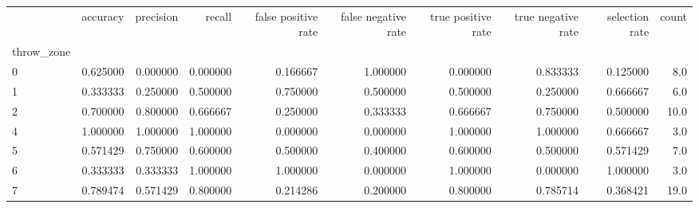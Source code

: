 \begin{tabular}{lrrrrrrrrr}
\toprule
{} &  accuracy &  precision &    recall &  false positive rate &  false negative rate &  true positive rate &  true negative rate &  selection rate &  count \\
throw\_zone &           &            &           &                      &                      &                     &                     &                 &        \\
\midrule
0          &  0.625000 &   0.000000 &  0.000000 &             0.166667 &             1.000000 &            0.000000 &            0.833333 &        0.125000 &    8.0 \\
1          &  0.333333 &   0.250000 &  0.500000 &             0.750000 &             0.500000 &            0.500000 &            0.250000 &        0.666667 &    6.0 \\
2          &  0.700000 &   0.800000 &  0.666667 &             0.250000 &             0.333333 &            0.666667 &            0.750000 &        0.500000 &   10.0 \\
4          &  1.000000 &   1.000000 &  1.000000 &             0.000000 &             0.000000 &            1.000000 &            1.000000 &        0.666667 &    3.0 \\
5          &  0.571429 &   0.750000 &  0.600000 &             0.500000 &             0.400000 &            0.600000 &            0.500000 &        0.571429 &    7.0 \\
6          &  0.333333 &   0.333333 &  1.000000 &             1.000000 &             0.000000 &            1.000000 &            0.000000 &        1.000000 &    3.0 \\
7          &  0.789474 &   0.571429 &  0.800000 &             0.214286 &             0.200000 &            0.800000 &            0.785714 &        0.368421 &   19.0 \\
\bottomrule
\end{tabular}
